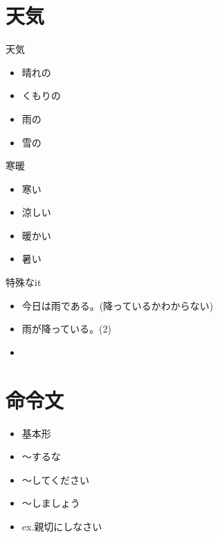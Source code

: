 \documentclass[10pt]{jsarticle}
\newcommand{\answer}[2]{{\color{orange}#2}}
\newcommand{\answer}[2]{\vspace{#1mm}}
\begin{document}
\section{天気}
\begin{itembox}[l]{天気}
  \begin{multicols}{4}
    \begin{itemize}
      \item 晴れの \answer{5}{}
      \item くもりの \answer{5}{}
      \item 雨の \answer{5}{}
      \item 雪の \answer{5}{}
    \end{itemize}
  \end{multicols}
\end{itembox}
\begin{itembox}[l]{寒暖}
  \begin{multicols}{4}
    \begin{itemize}
      \item 寒い \answer{5}{}
      \item 涼しい \answer{5}{}
      \item 暖かい \answer{5}{}
      \item 暑い \answer{5}{}
    \end{itemize}
  \end{multicols}
\end{itembox}
\begin{itembox}[l]{特殊なit}
  \begin{itemize}
    \item 今日は雨である。(降っているかわからない) \answer{5}{}
    \item 雨が降っている。(2)
    \item  \answer{5}{}
  \end{itemize}
\end{itembox}

\section{命令文}
\begin{screen}
  \begin{itemize}
    \item 基本形 \answer{5}{}
    \item 〜するな \answer{5}{}
    \item 〜してください \answer{5}{}
    \item 〜しましょう \answer{5}{}
    \item ex.親切にしなさい \answer{5}{}
  \end{itemize}
\end{screen}
\end{document}
